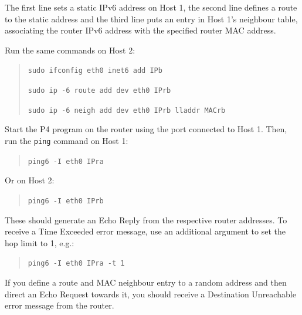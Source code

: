 The first line sets a static IPv6 address on Host 1, the second line defines a route to the static address and the third line puts an entry in Host 1’s neighbour table, associating the router IPv6 address with the specified router MAC address.

Run the same commands on Host 2:
\begin{quote}
    \texttt{sudo ifconfig eth0 inet6 add IPb}
    
    \texttt{sudo ip -6 route add dev eth0 IPrb}
    
    \texttt{sudo ip -6 neigh add dev eth0 IPrb lladdr MACrb}
\end{quote}

Start the P4 program on the router using the port connected to Host 1. Then, run the \texttt{ping} command on Host 1:
\begin{quote}
    \texttt{ping6 -I eth0 IPra}
\end{quote}

Or on Host 2: 
\begin{quote}
    \texttt{ping6 -I eth0 IPrb}
\end{quote}

These should generate an Echo Reply from the respective router addresses. To receive a Time Exceeded error message, use an additional argument to set the hop limit to 1, e.g.:
\begin{quote}
    \texttt{ping6 -I eth0 IPra -t 1}
\end{quote}

If you define a route and MAC neighbour entry to a random address and then direct an Echo Request towards it, you should receive a Destination Unreachable error message from the router.
